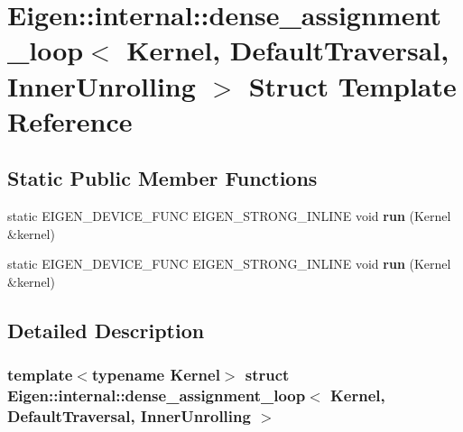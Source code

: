 \hypertarget{struct_eigen_1_1internal_1_1dense__assignment__loop_3_01_kernel_00_01_default_traversal_00_01_inner_unrolling_01_4}{}\section{Eigen\+:\+:internal\+:\+:dense\+\_\+assignment\+\_\+loop$<$ Kernel, Default\+Traversal, Inner\+Unrolling $>$ Struct Template Reference}
\label{struct_eigen_1_1internal_1_1dense__assignment__loop_3_01_kernel_00_01_default_traversal_00_01_inner_unrolling_01_4}
\subsection*{Static Public Member Functions}
\begin{DoxyCompactItemize}
\item 
\mbox{\label{struct_eigen_1_1internal_1_1dense__assignment__loop_3_01_kernel_00_01_default_traversal_00_01_inner_unrolling_01_4_a02ff3628c48eb236d79bf69c05791a49}} 
static E\+I\+G\+E\+N\+\_\+\+D\+E\+V\+I\+C\+E\+\_\+\+F\+U\+NC E\+I\+G\+E\+N\+\_\+\+S\+T\+R\+O\+N\+G\+\_\+\+I\+N\+L\+I\+NE void {\bfseries run} (Kernel \&kernel)
\item 
\mbox{\label{struct_eigen_1_1internal_1_1dense__assignment__loop_3_01_kernel_00_01_default_traversal_00_01_inner_unrolling_01_4_a02ff3628c48eb236d79bf69c05791a49}} 
static E\+I\+G\+E\+N\+\_\+\+D\+E\+V\+I\+C\+E\+\_\+\+F\+U\+NC E\+I\+G\+E\+N\+\_\+\+S\+T\+R\+O\+N\+G\+\_\+\+I\+N\+L\+I\+NE void {\bfseries run} (Kernel \&kernel)
\end{DoxyCompactItemize}


\subsection{Detailed Description}
\subsubsection*{template$<$typename Kernel$>$\newline
struct Eigen\+::internal\+::dense\+\_\+assignment\+\_\+loop$<$ Kernel, Default\+Traversal, Inner\+Unrolling $>$}



